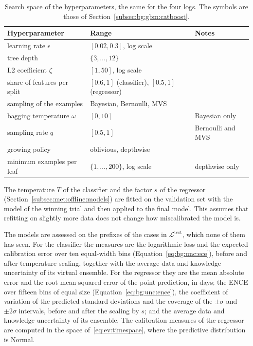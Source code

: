 \begin{table}[h]
  \centering
  \small
  \begin{tabular}{lll}
    \toprule
    Hyperparameter & Range & Notes \\
    \midrule
    learning rate $\epsilon$ & $[0.02, 0.3]$, log scale & \\
    tree depth & $\{3, \dots, 12\}$ & \\
    L2 coefficient $\zeta$ & $[1, 50]$, log scale & \\
    share of features per split & $[0.6, 1]$ (classifier), $[0.5, 1]$ (regressor) & \\
    sampling of the examples & Bayesian, Bernoulli, MVS & \\
    \quad bagging temperature $\omega$ & $[0, 10]$ & Bayesian only \\
    \quad sampling rate $q$ & $[0.5, 1]$ & Bernoulli and MVS \\
    growing policy & oblivious, depthwise & \\
    \quad minimum examples per leaf & $\{1, \dots, 200\}$, log scale & depthwise only \\
    \bottomrule
  \end{tabular}
  \caption{Search space of the hyperparameters, the same for the four logs.
    The symbols are those of Section~\ref{subsec:bg:gbm:catboost}.}
  \label{tab:ev:search}
\end{table}

The temperature $T$ of the classifier and the factor $s$ of the regressor
(Section~\ref{subsec:met:offline:models}) are fitted on the validation set
with the model of the winning trial and then applied to the final model.
This assumes that refitting on slightly more data does not change how
miscalibrated the model is.

The models are assessed on the prefixes of the cases in
$\mathcal{L}^{\mathrm{test}}$, which none of them has seen. For the
classifier the measures are the logarithmic loss and the expected
calibration error over ten equal-width bins
(Equation~\eqref{eq:bg:unc:ece}), before and after temperature scaling,
together with the average data and knowledge uncertainty of its virtual
ensemble. For the regressor they are the mean absolute error and the root
mean squared error of the point prediction, in days; the ENCE over fifteen
bins of equal size (Equation~\eqref{eq:bg:unc:ence}), the coefficient of
variation of the predicted standard deviations and the coverage of the
$\pm\sigma$ and $\pm 2\sigma$ intervals, before and after the scaling by
$s$; and the average data and knowledge uncertainty of its ensemble. The
calibration measures of the regressor are computed in the space
of~\eqref{eq:ev:timespace}, where the predictive distribution is Normal.


